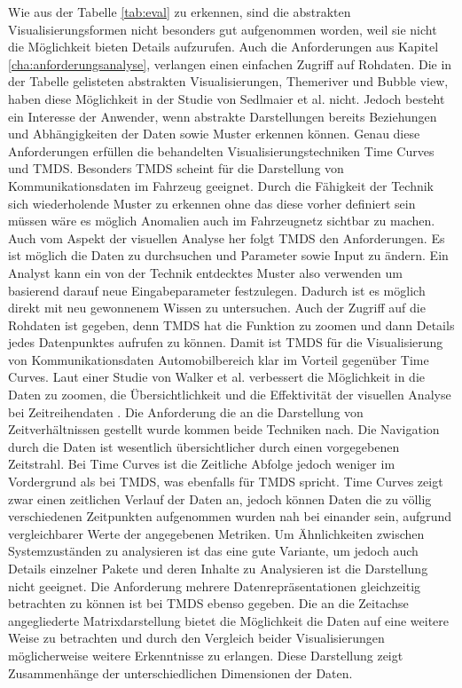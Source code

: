 \documentclass[draft=false
              ,paper=a4
              ,twoside=false
              ,fontsize=11pt
              ,headsepline
              ,BCOR10mm
              ,DIV11
              ]{scrbook}
\begin{document}
Wie aus der Tabelle \ref{tab:eval} zu erkennen, sind die abstrakten Visualisierungsformen nicht besonders gut aufgenommen worden, weil sie nicht die Möglichkeit bieten Details aufzurufen. Auch die Anforderungen aus Kapitel \ref{cha:anforderungsanalyse}, verlangen einen einfachen Zugriff auf Rohdaten. Die in der Tabelle gelisteten abstrakten Visualisierungen, Themeriver und Bubble view, haben diese Möglichkeit in der Studie von Sedlmaier et al. \cite{sedlmair2009} nicht. Jedoch besteht ein Interesse der Anwender, wenn abstrakte Darstellungen bereits Beziehungen und Abhängigkeiten der Daten sowie Muster erkennen können. Genau diese Anforderungen erfüllen die behandelten Visualisierungstechniken Time Curves und TMDS. Besonders TMDS scheint für die Darstellung von Kommunikationsdaten im Fahrzeug geeignet. Durch die Fähigkeit der Technik sich wiederholende Muster zu erkennen ohne das diese vorher definiert sein müssen wäre es möglich Anomalien auch im Fahrzeugnetz sichtbar zu machen. Auch vom Aspekt der visuellen Analyse her folgt TMDS den Anforderungen. Es ist möglich die Daten zu durchsuchen und Parameter sowie Input zu ändern. Ein Analyst kann ein von der Technik entdecktes Muster also verwenden um basierend darauf neue Eingabeparameter festzulegen. Dadurch ist es möglich direkt mit neu gewonnenem Wissen zu untersuchen. Auch der Zugriff auf die Rohdaten ist gegeben, denn TMDS hat die Funktion zu zoomen und dann Details jedes Datenpunktes aufrufen zu können. Damit ist TMDS für die Visualisierung von Kommunikationsdaten Automobilbereich klar im Vorteil gegenüber Time Curves. Laut einer Studie von Walker et al. verbessert die Möglichkeit in die Daten zu zoomen, die Übersichtlichkeit und die Effektivität der visuellen Analyse bei Zeitreihendaten \cite{walker_timenotes:_2016}. Die Anforderung die an die Darstellung von Zeitverhältnissen gestellt wurde kommen beide Techniken nach. Die Navigation durch die Daten ist wesentlich übersichtlicher durch einen vorgegebenen Zeitstrahl. Bei Time Curves ist die Zeitliche Abfolge jedoch weniger im Vordergrund als bei TMDS, was ebenfalls für TMDS spricht. Time Curves zeigt zwar einen zeitlichen Verlauf der Daten an, jedoch können Daten die zu völlig verschiedenen Zeitpunkten aufgenommen wurden nah bei einander sein, aufgrund vergleichbarer Werte der angegebenen Metriken. Um Ähnlichkeiten zwischen Systemzuständen zu analysieren ist das eine gute Variante, um jedoch auch Details einzelner Pakete und deren Inhalte zu Analysieren ist die Darstellung nicht geeignet. Die Anforderung mehrere Datenrepräsentationen gleichzeitig betrachten zu können ist bei TMDS ebenso gegeben. Die an die Zeitachse angegliederte Matrixdarstellung bietet die Möglichkeit die Daten auf eine weitere Weise zu betrachten und durch den Vergleich beider Visualisierungen möglicherweise weitere Erkenntnisse zu erlangen. Diese Darstellung zeigt Zusammenhänge der unterschiedlichen Dimensionen der Daten.
\end{document}

